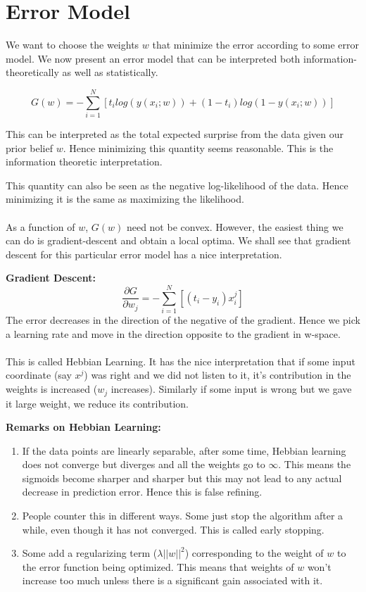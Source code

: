 \documentclass{article}%
\begin{document}
\section{Error Model}
We want to choose the weights $w$ that minimize the error according to some error model. We now present an error model that can be interpreted both information-theoretically as well as statistically.

$$G(w) = -\sum_{i=1}^N[t_ilog(y(x_i;w))+(1-t_i)log(1-y(x_i;w))]$$

This can be interpreted as the total expected surprise from the data given our prior belief $w$. Hence minimizing this quantity seems reasonable. This is the information theoretic interpretation.

This quantity can also be seen as the negative log-likelihood of the data. Hence minimizing it is the same as maximizing the likelihood.
\\ \\
As a function of $w$, $G(w)$ need not be convex. However, the easiest thing we can do is gradient-descent and obtain a local optima. We shall see that gradient descent for this particular error model has a nice interpretation.

\textbf{Gradient Descent:}
$$\frac{\partial G}{\partial w_j} = -\sum_{i=1}^N[(t_i-y_i)x_i^j]$$
The error decreases in the direction of the negative of the gradient.
Hence we pick a learning rate and move in the direction opposite to the gradient in w-space.
\\ \\
This is called Hebbian Learning. It has the nice interpretation that if some input coordinate (say $x^j$) was right and we did not listen to it, it's contribution in the weights is increased ($w_j$ increases). Similarly if some input is wrong but we gave it large weight, we reduce its contribution.

\textbf{Remarks on Hebbian Learning:}
\begin{enumerate}
\item If the data points are linearly separable, after some time, Hebbian learning does not converge but diverges and all the weights go to $\infty$. This means the sigmoids become sharper and sharper but this may not lead to any actual decrease in prediction error. Hence this is false refining.
\item People counter this in different ways. Some just stop the algorithm after a while, even though it has not converged. This is called early stopping.
\item Some add a regularizing term ($\lambda ||w||^2$) corresponding to the weight of $w$ to the error function being optimized. This means that weights of $w$ won't increase too much unless there is a significant gain associated with it.
\end{enumerate}
\end{document}
